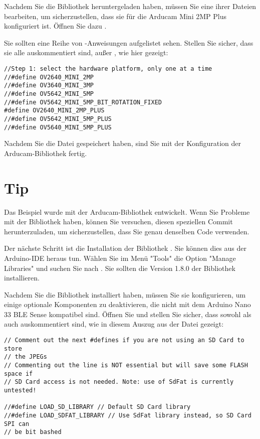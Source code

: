 Nachdem Sie die Bibliothek heruntergeladen haben, müssen Sie eine ihrer Dateien bearbeiten, um sicherzustellen, dass sie für die Arducam Mini 2MP Plus konfiguriert ist. Öffnen Sie dazu .

Sie sollten eine Reihe von -Anweisungen aufgelistet sehen. Stellen Sie sicher, dass sie alle auskommentiert sind, außer , wie hier gezeigt:

\begin{code}
    \begin{lstlisting}
//Step 1: select the hardware platform, only one at a time
//#define OV2640_MINI_2MP
//#define OV3640_MINI_3MP
//#define OV5642_MINI_5MP
//#define OV5642_MINI_5MP_BIT_ROTATION_FIXED
#define OV2640_MINI_2MP_PLUS
//#define OV5642_MINI_5MP_PLUS
//#define OV5640_MINI_5MP_PLUS
  \end{lstlisting}
\end{code}

Nachdem Sie die Datei gespeichert haben, sind Sie mit der Konfiguration der Arducam-Bibliothek fertig.

\section{Tip}

Das Beispiel wurde mit  der Arducam-Bibliothek entwickelt. Wenn Sie Probleme mit der Bibliothek haben, können Sie versuchen, diesen speziellen Commit herunterzuladen, um sicherzustellen, dass Sie genau denselben Code verwenden.

Der nächste Schritt ist die Installation der Bibliothek . Sie können dies aus der Arduino-IDE heraus tun. Wählen Sie im Menü "Tools" die Option "Manage Libraries" und suchen Sie nach . Sie sollten die Version 1.8.0 der Bibliothek installieren.

Nachdem Sie die Bibliothek installiert haben, müssen Sie sie konfigurieren, um einige optionale Komponenten zu deaktivieren, die nicht mit dem Arduino Nano 33 BLE Sense kompatibel sind. Öffnen Sie  und stellen Sie sicher, dass sowohl  als auch  auskommentiert sind, wie in diesem Auszug aus der Datei gezeigt:

\begin{code}
    \begin{lstlisting}
// Comment out the next #defines if you are not using an SD Card to store
// the JPEGs
// Commenting out the line is NOT essential but will save some FLASH space if
// SD Card access is not needed. Note: use of SdFat is currently untested!

//#define LOAD_SD_LIBRARY // Default SD Card library
//#define LOAD_SDFAT_LIBRARY // Use SdFat library instead, so SD Card SPI can
// be bit bashed
  \end{lstlisting}
\end{code}

